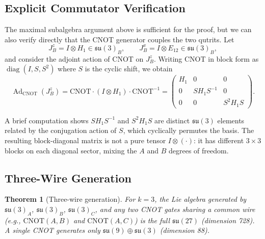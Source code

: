 \documentclass[12pt,a4paper]{article}
\newtheorem{theorem}{Theorem}
\newcommand{\Ad}{\operatorname{Ad}}
\begin{document}
\subsection{Explicit Commutator Verification}

The maximal subalgebra argument above is sufficient for the proof, but
we can also verify directly that the CNOT generator couples the two
qutrits. Let
\[
J_B^z = I \otimes H_1 \in \mathfrak{su}(3)_B,\qquad
J_B^x = I \otimes E_{12} \in \mathfrak{su}(3)_B,
\]
and consider the adjoint action of CNOT on $J_B^z$. Writing CNOT in
block form as $\operatorname{diag}(I, S, S^2)$ where $S$ is the cyclic
shift, we obtain
\[
\Ad_{\text{CNOT}}(J_B^z) = \text{CNOT} \cdot (I \otimes H_1) \cdot
\text{CNOT}^{-1}
= \begin{pmatrix} H_1 & 0 & 0 \\ 0 & S H_1 S^{-1} & 0 \\
0 & 0 & S^2 H_1 S \end{pmatrix}.
\]

A brief computation shows $S H_1 S^{-1}$ and $S^2 H_1 S$ are distinct
$\mathfrak{su}(3)$ elements related by the conjugation action of $S$,
which cyclically permutes the basis. The resulting block-diagonal matrix
is not a pure tensor $I \otimes (\cdot)$: it has different $3\times 3$
blocks on each diagonal sector, mixing the $A$ and $B$ degrees of freedom.

\subsection{Three-Wire Generation}

\begin{theorem}[Three-wire generation]
\label{thm:3wire}
For $k=3$, the Lie algebra generated by $\mathfrak{su}(3)_A$,
$\mathfrak{su}(3)_B$, $\mathfrak{su}(3)_C$, and any two CNOT gates
sharing a common wire (e.g., $\text{CNOT}(A,B)$ and $\text{CNOT}(A,C)$)
is the full $\mathfrak{su}(27)$ (dimension 728). A single CNOT generates
only $\mathfrak{su}(9) \oplus \mathfrak{su}(3)$ (dimension 88).
\end{theorem}
\end{document}
